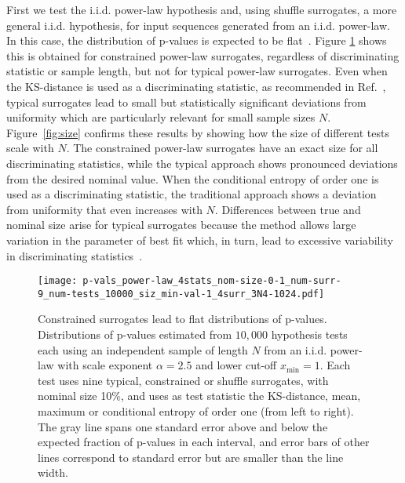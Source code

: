 \documentclass[%
prx,
reprint,
superscriptaddress,
nofootinbib,
 amsmath,amssymb,
 aps,
floatfix,
]{revtex4-2}
\begin{document}
First we test the i.i.d. power-law hypothesis and, using shuffle surrogates, a more general i.i.d. hypothesis, for input sequences generated from an i.i.d. power-law. In this case, the distribution of p-values is expected to be flat~\cite{hung1997behavior,bhattacharya2002median}. Figure \ref{fig:p_vals} shows this is obtained for constrained power-law surrogates, regardless of discriminating statistic or sample length, but not for typical power-law surrogates. Even when the KS-distance is used as a discriminating statistic, as recommended in Ref.~\cite{clauset2009power}, typical surrogates lead to small but statistically significant deviations from uniformity which are particularly relevant for small sample sizes $N$. Figure~\ref{fig:size} confirms these results by showing how the size of different tests scale with $N$. The constrained power-law surrogates have an exact size for all discriminating statistics, while the typical approach shows pronounced deviations from the desired nominal value. When the conditional entropy of order one is used as a discriminating statistic, the traditional approach shows a deviation from uniformity that even increases with $N$. Differences between true and nominal size arise for typical surrogates because the method allows large variation in the parameter of best fit which, in turn, lead to excessive variability in discriminating statistics~\cite{theiler1996constrained}.

\begin{figure}[htbp]

\texttt{[image: p-vals\_power-law\_4stats\_nom-size-0-1\_num-surr-9\_num-tests\_10000\_siz\_min-val-1\_4surr\_3N4-1024.pdf]}

\caption{Constrained surrogates lead to flat distributions of p-values. Distributions of p-values estimated from $10,000$ hypothesis tests each using an independent sample of length $N$ from an i.i.d. power-law with scale exponent $\alpha = 2.5$ and lower cut-off $x_{\min} = 1$. Each test uses nine typical, constrained or shuffle surrogates, with nominal size 10\%, and uses as test statistic the KS-distance, mean, maximum or conditional entropy of order one (from left to right). The gray line spans one standard error above and below the expected fraction of p-values in each interval, and error bars of other lines correspond to standard error but are smaller than the line width. 
}
\label{fig:p_vals}
\end{figure}
\end{document}
